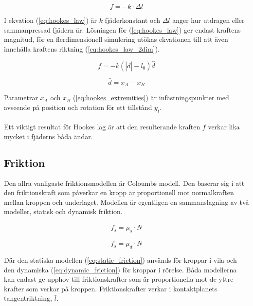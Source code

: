 \documentclass[a4paper,12pt,twopage,swedish]{article}
\begin{document}
\begin{equation}\label{eq:hookes_law}
f = - k \cdot \Delta l
\end{equation}

I ekvation (\ref{eq:hookes_law}) är $k$  fjäderkonstant och $\Delta l$ anger hur utdragen eller sammanpressad fjädern är. Lösningen för (\ref{eq:hookes_law}) ger endast  kraftens magnitud, för en flerdimensionell simulering utökas ekvationen till att även innehålla kraftens riktning (\ref{eq:hookes_law_2dim}).

\begin{equation}\label{eq:hookes_law_2dim}
f = - k (|\bar{d}| - l_0)\hat{d}
\end{equation}

\begin{equation}\label{eq:hookes_extremities}
\bar{d} = x_A - x_B
\end{equation}

Parametrar $x_A$ och $x_B$ (\ref{eq:hookes_extremities}) är infästningspunkter med avseende på position och rotation för ett tillstånd $y_t$.
\\
\\Ett viktigt resultat för Hookes lag är att den resulterande kraften $f$ verkar lika mycket i fjäderns båda ändar.

\subsection{Friktion}

Den allra vanligaste friktionsmodellen är Coloumbs modell. Den baserar sig i att den friktionskraft som påverkar en kropp är proportionell mot normalkraften mellan kroppen och underlaget. Modellen är egentligen en sammanslagning av två modeller, statisk och dynamisk friktion.

\begin{equation}\label{eq:static_friction}
\bar{f_s} = \mu_s \cdot \bar{N}
\end{equation}

\begin{equation}\label{eq:dynamic_friction}
\bar{f_s} = \mu_d \cdot \bar{N}
\end{equation}

Där den statiska modellen (\ref{eq:static_friction}) används för kroppar i vila och den dynamiska (\ref{eq:dynamic_friction}) för kroppar i rörelse. Båda modellerna kan endast ge upphov till friktionskrafter som är proportionella mot de yttre krafter som verkar på kroppen. Friktionskrafter verkar i kontaktplanets tangentriktning, $\bar{t}$.
\end{document}
